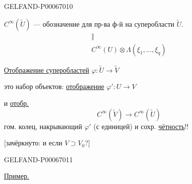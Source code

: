 \begin{GelfandAdjacentEvidence}{GELFAND-P000670}{10}


\(C^\infty(\widetilde U)\) --- обозначение для пр-ва ф-й на суперобласти \(\widetilde U\).
\[
\begin{gathered}
\Vert\\
C^\infty(U)\otimes\Lambda(\xi_1,\ldots,\xi_q)
\end{gathered}
\]

\underline{Отображение суперобластей} \(\varphi:\widetilde U\longrightarrow\widetilde V\)

это набор объектов: \underline{отображение} \(\varphi':U\to V\)

и \underline{отобр.}
\[
C^\infty(\widetilde V)\longrightarrow C^\infty(\widetilde U)
\]
гом. колец, накрывающий \(\varphi'\) (с единицей) и сохр. \underline{чётность}!!

[зачёркнуто: и если \(V\supset V_0\)?]
\end{GelfandAdjacentEvidence}
\begin{GelfandAdjacentEvidence}{GELFAND-P000670}{11}


\underline{\underline{Пример.}}
\end{GelfandAdjacentEvidence}
